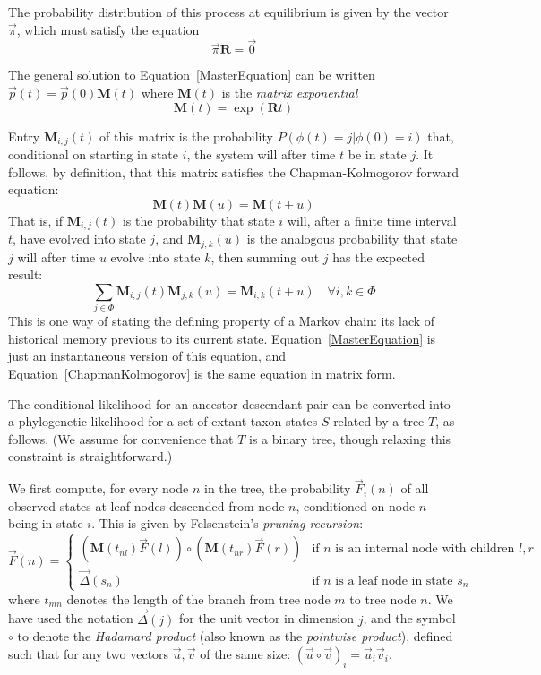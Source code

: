 \documentclass{bmcart}
\newcommand{\matr}[1]{\mathbf{#1}}
\newcommand{\eqref}[1]{Equation~\ref{#1}}
\newcommand{\statespace}{\Phi}
\newcommand{\state}{\phi}
\newcommand{\statevec}{\vec{p}}
\newcommand{\ratematrix}{\matr{R}}
\newcommand{\eqmvec}{\vec{\pi}}
\newcommand{\condmatrix}{\matr{M}}
\newcommand{\felsvec}{\vec{F}}
\newcommand{\unitvec}{\vec{\Delta}}
\newcommand{\pointprod}{\circ}
\begin{document}
The probability distribution of this process at equilibrium is given by the vector $\eqmvec$,
which must satisfy the equation
\[
\eqmvec \ratematrix = \vec{0}
\]

The general solution to \eqref{MasterEquation} can be
written $\statevec(t) = \statevec(0) \condmatrix(t)$
where $\condmatrix(t)$ is the {\em matrix exponential}
\begin{equation}
\condmatrix(t) = \exp ( \ratematrix t )
\label{MatrixExponential}
\end{equation}

Entry $\condmatrix_{i,j}(t)$ of this matrix is the probability
$P(\state(t)=j|\state(0)=i)$
that, conditional on starting in state $i$,
the system will after time $t$ be in state $j$.
It follows, by definition, that this matrix satisfies the
Chapman-Kolmogorov forward equation:
\begin{equation}
\condmatrix(t) \condmatrix(u) = \condmatrix(t+u)
\label{ChapmanKolmogorov}
\end{equation}
That is, if $\condmatrix_{i,j}(t)$ is the probability
that state $i$ will, after a finite time interval $t$, have evolved into state $j$,
and $\condmatrix_{j,k}(u)$ is the analogous probability that state $j$ will after time $u$ evolve into state $k$,
then summing out $j$ has the expected result:
\[
\sum_{j \in \statespace} \condmatrix_{i,j}(t) \condmatrix_{j,k}(u) = \condmatrix_{i,k}(t+u)
\quad \forall i,k \in \statespace
\]
This is one way of stating the defining property of a Markov chain:
its lack of historical memory previous to its current state.
\eqref{MasterEquation} is just an instantaneous version of this equation,
and \eqref{ChapmanKolmogorov} is the same equation in matrix form.

The conditional likelihood for an ancestor-descendant pair can be converted
into a phylogenetic likelihood for a set of extant taxon states $S$ related by a tree $T$,
as follows.
(We assume for convenience that $T$ is a binary tree, though relaxing this constraint is straightforward.)

We first compute, for every node $n$ in the tree,
the probability $\felsvec_i(n)$
of all observed states at leaf nodes descended from node $n$,
conditioned on node $n$ being in state $i$.
This is given by Felsenstein's {\em pruning recursion}:
\begin{equation}
\felsvec(n) = \left\{
\begin{array}{ll}
\displaystyle
\left( \condmatrix(t_{nl}) \felsvec(l) \right)
\pointprod
\left( \condmatrix(t_{nr}) \felsvec(r) \right)
& \mbox{if $n$ is an internal node with children $l,r$} \\
\displaystyle
\vec{\Delta}(s_n)
& \mbox{if $n$ is a leaf node in state $s_n$}
\end{array}
\right.
\label{Felsenstein}
\end{equation}
where $t_{mn}$ denotes the length of the branch from tree node $m$ to tree node $n$.
We have used the notation
$\unitvec(j)$ for the unit vector in dimension $j$,
and the symbol
$\pointprod$ to denote the {\em Hadamard product} (also known as the {\em pointwise product}),
defined such that for any two vectors $\vec{u},\vec{v}$ of the same size:
$(\vec{u} \pointprod \vec{v})_i = \vec{u}_i \vec{v}_i$.
\end{document}
